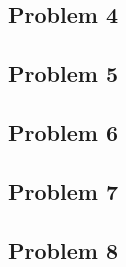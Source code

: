 \documentclass[english]{article}
\begin{document}
\subsection*{Problem 4}

\subsection*{Problem 5}

\subsection*{Problem 6}

\subsection*{Problem 7}

\subsection*{Problem 8}
\end{document}

